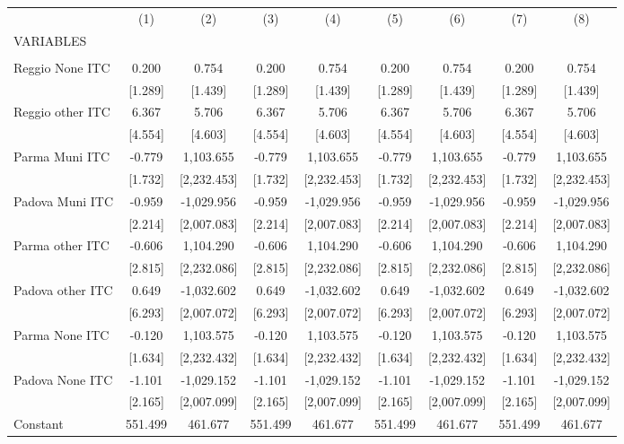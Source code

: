 \begin{tabular}{lcccccccc} \hline
 & (1) & (2) & (3) & (4) & (5) & (6) & (7) & (8) \\
VARIABLES &  &  &  &  &  &  &  &  \\ \hline
 &  &  &  &  &  &  &  &  \\
Reggio None ITC & 0.200 & 0.754 & 0.200 & 0.754 & 0.200 & 0.754 & 0.200 & 0.754 \\
 & [1.289] & [1.439] & [1.289] & [1.439] & [1.289] & [1.439] & [1.289] & [1.439] \\
Reggio other ITC & 6.367 & 5.706 & 6.367 & 5.706 & 6.367 & 5.706 & 6.367 & 5.706 \\
 & [4.554] & [4.603] & [4.554] & [4.603] & [4.554] & [4.603] & [4.554] & [4.603] \\
Parma Muni ITC & -0.779 & 1,103.655 & -0.779 & 1,103.655 & -0.779 & 1,103.655 & -0.779 & 1,103.655 \\
 & [1.732] & [2,232.453] & [1.732] & [2,232.453] & [1.732] & [2,232.453] & [1.732] & [2,232.453] \\
Padova Muni ITC & -0.959 & -1,029.956 & -0.959 & -1,029.956 & -0.959 & -1,029.956 & -0.959 & -1,029.956 \\
 & [2.214] & [2,007.083] & [2.214] & [2,007.083] & [2.214] & [2,007.083] & [2.214] & [2,007.083] \\
Parma other ITC & -0.606 & 1,104.290 & -0.606 & 1,104.290 & -0.606 & 1,104.290 & -0.606 & 1,104.290 \\
 & [2.815] & [2,232.086] & [2.815] & [2,232.086] & [2.815] & [2,232.086] & [2.815] & [2,232.086] \\
Padova other ITC & 0.649 & -1,032.602 & 0.649 & -1,032.602 & 0.649 & -1,032.602 & 0.649 & -1,032.602 \\
 & [6.293] & [2,007.072] & [6.293] & [2,007.072] & [6.293] & [2,007.072] & [6.293] & [2,007.072] \\
Parma None ITC & -0.120 & 1,103.575 & -0.120 & 1,103.575 & -0.120 & 1,103.575 & -0.120 & 1,103.575 \\
 & [1.634] & [2,232.432] & [1.634] & [2,232.432] & [1.634] & [2,232.432] & [1.634] & [2,232.432] \\
Padova None ITC & -1.101 & -1,029.152 & -1.101 & -1,029.152 & -1.101 & -1,029.152 & -1.101 & -1,029.152 \\
 & [2.165] & [2,007.099] & [2.165] & [2,007.099] & [2.165] & [2,007.099] & [2.165] & [2,007.099] \\
Constant & 551.499 & 461.677 & 551.499 & 461.677 & 551.499 & 461.677 & 551.499 & 461.677 \\

\end{tabular}
